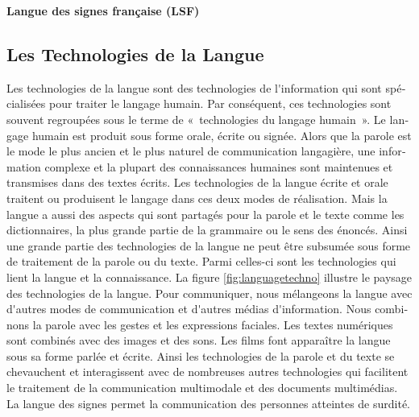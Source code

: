 \documentclass[]{../metanetpaper}
\begin{document}
\begin{french}
\begin{multicols}{2}
{\bf Langue des signes française (LSF)}\\

\end{multicols}

\clearpage


\begin{multicols}{2}

\subsection{Les Technologies de la Langue}

Les technologies de la langue sont des technologies de l{\mbox '}information
qui sont spécialisées pour traiter le langage humain. Par conséquent,
ces technologies sont souvent regroupées sous le terme de «~technologies
du langage humain~». Le langage humain est produit sous forme orale,
écrite ou signée. Alors que la parole est le mode le plus ancien et le
plus naturel de communication langagière, une information complexe et
la plupart des connaissances humaines sont maintenues et transmises
dans des textes écrits. Les technologies de la langue écrite et orale
traitent ou produisent le langage dans ces deux modes de
réalisation. Mais la langue a aussi des aspects qui sont partagés pour
la parole et le texte comme les dictionnaires, la plus grande partie
de la grammaire ou le sens des énoncés. Ainsi une grande partie des
technologies de la langue ne peut être subsumée sous forme de
traitement de la parole ou du texte. Parmi celles-ci sont les
technologies qui lient la langue et la connaissance. La figure
\ref{fig:languagetechno} illustre le paysage des technologies de la
langue. Pour communiquer, nous mélangeons la langue avec d{\mbox '}autres
modes de communication et d{\mbox '}autres médias d{\mbox '}information. Nous
combinons la parole avec les gestes et les expressions faciales. Les
textes numériques sont combinés avec des images et des sons. Les films
font apparaître la langue sous sa forme parlée et écrite. Ainsi les
technologies de la parole et du texte se chevauchent et interagissent
avec de nombreuses autres technologies qui facilitent le traitement de
la communication multimodale et des documents multimédias.  La langue
des signes permet la communication des personnes atteintes de surdité.


\end{multicols}
\end{french}
\end{document}
